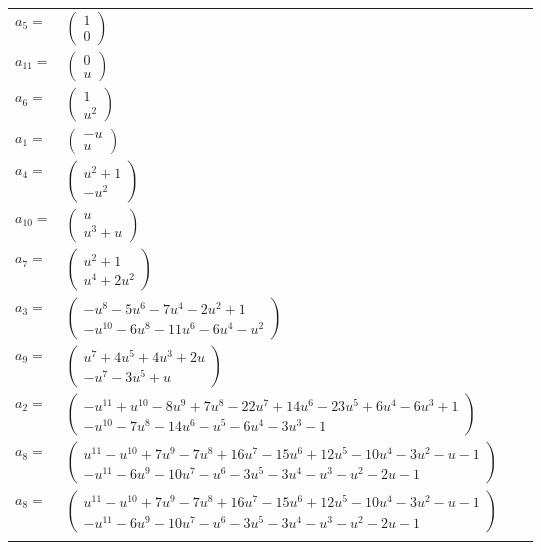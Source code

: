 \documentclass[1p]{elsarticle_modified}
\theoremstyle{definition}
\begin{document}
\begin{tabular}{m{7pt} m{180pt} m{7pt} m{180pt} }
\flushright $a_{5}=$&$\begin{pmatrix}1\\0\end{pmatrix}$ \\
\flushright $a_{11}=$&$\begin{pmatrix}0\\u\end{pmatrix}$ \\
\flushright $a_{6}=$&$\begin{pmatrix}1\\u^2\end{pmatrix}$ \\
\flushright $a_{1}=$&$\begin{pmatrix}- u\\u\end{pmatrix}$ \\
\flushright $a_{4}=$&$\begin{pmatrix}u^2+1\\- u^2\end{pmatrix}$ \\
\flushright $a_{10}=$&$\begin{pmatrix}u\\u^3+u\end{pmatrix}$ \\
\flushright $a_{7}=$&$\begin{pmatrix}u^2+1\\u^4+2 u^2\end{pmatrix}$ \\
\flushright $a_{3}=$&$\begin{pmatrix}- u^8-5 u^6-7 u^4-2 u^2+1\\- u^{10}-6 u^8-11 u^6-6 u^4- u^2\end{pmatrix}$ \\
\flushright $a_{9}=$&$\begin{pmatrix}u^7+4 u^5+4 u^3+2 u\\- u^7-3 u^5+u\end{pmatrix}$ \\
\flushright $a_{2}=$&$\begin{pmatrix}- u^{11}+u^{10}-8 u^9+7 u^8-22 u^7+14 u^6-23 u^5+6 u^4-6 u^3+1\\- u^{10}-7 u^8-14 u^6- u^5-6 u^4-3 u^3-1\end{pmatrix}$ \\
\flushright $a_{8}=$&$\begin{pmatrix}u^{11}- u^{10}+7 u^9-7 u^8+16 u^7-15 u^6+12 u^5-10 u^4-3 u^2- u-1\\- u^{11}-6 u^9-10 u^7- u^6-3 u^5-3 u^4- u^3- u^2-2 u-1\end{pmatrix}$\\ \flushright $a_{8}=$&$\begin{pmatrix}u^{11}- u^{10}+7 u^9-7 u^8+16 u^7-15 u^6+12 u^5-10 u^4-3 u^2- u-1\\- u^{11}-6 u^9-10 u^7- u^6-3 u^5-3 u^4- u^3- u^2-2 u-1\end{pmatrix}$\\&\end{tabular}
\end{document}

